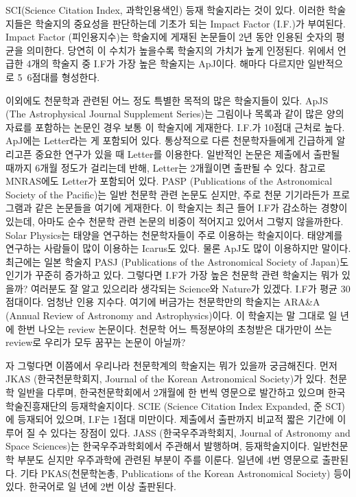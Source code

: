 SCI(Science Citation Index, 과학인용색인) 등재 학술지라는 것이 있다. 이러한
학술지들은 학술지의 중요성을 판단하는데 기초가 되는 Impact Factor (I.F.)가
부여된다. Impact Factor (피인용지수)는 학술지에 게재된 논문들이 2년 동안 인용된
숫자의 평균을 의미한다. 당연히 이 수치가 높을수록 학술지의 가치가 높게
인정된다. 위에서 언급한 4개의 학술지 중 I.F가 가장 높은 학술지는 ApJ이다. 해마다
다르지만 일반적으로 5~6점대를 형성한다.

이외에도 천문학과 관련된 어느 정도 특별한 목적의 많은 학술지들이 있다. ApJS (The
Astrophysical Journal Supplement Series)는 그림이나 목록과 같이 많은 양의 자료를
포함하는 논문인 경우 보통 이 학술지에 게재한다. I.F.가 10점대 근처로 높다.
ApJ에는 Letter라는 게 포함되어 있다. 통상적으로 다른 천문학자들에게 긴급하게
알리고픈 중요한 연구가 있을 때 Letter를 이용한다. 일반적인 논문은 제출에서 출판될
때까지 6개월 정도가 걸리는데 반해, Letter는 2개월이면 출판될 수 있다. 참고로
MNRAS에도 Letter가 포함되어 있다.  PASP (Publications of the Astronomical
Society of the Pacific)는 일반 천문학 관련 논문도 싣지만, 주로 천문 기기라든가
프로그램과 같은 논문들을 여기에 게재한다. 이 학술지는 최근 들어 I.F가 감소하는
경향이 있는데, 아마도 순수 천문학 관련 논문의 비중이 적어지고 있어서 그렇지
않을까한다. Solar Physics는 태양을 연구하는 천문학자들이 주로 이용하는
학술지이다. 태양계를 연구하는 사람들이 많이 이용하는 Icarus도 있다. 물론 ApJ도
많이 이용하지만 말이다. 최근에는 일본 학술지 PASJ (Publications of the
Astronomical Society of Japan)도 인기가 꾸준히 증가하고 있다.  그렇다면 I.F가
가장 높은 천문학 관련 학술지는 뭐가 있을까? 여러분도 잘 알고 있으리라 생각되는
Science와 Nature가 있겠다. I.F가 평균 30점대이다. 엄청난 인용 지수다. 여기에
버금가는 천문학만의 학술지는 ARA\&A (Annual Review of Astronomy and
Astrophysics)이다. 이 학술지는 말 그대로 일 년에 한번 나오는 review
논문이다. 천문학 어느 특정분야의 초청받은 대가만이 쓰는 review로 우리가 모두
꿈꾸는 논문이 아닐까?
 
자 그렇다면 이쯤에서 우리나라 천문학계의 학술지는 뭐가 있을까 궁금해진다. 먼저
JKAS (한국천문학회지, Journal of the Korean Astronomical Society)가 있다. 천문학
일반을 다루며, 한국천문학회에서 2개월에 한 번씩 영문으로 발간하고 있으며
한국학술진흥재단의 등재학술지이다. SCIE (Science Citation Index Expanded, 준
SCI)에 등재되어 있으며, I.F는 1점대 미만이다. 제출에서 출판까지 비교적 짧은
기간에 이루어 질 수 있다는 장점이 있다.  JASS (한국우주과학회지, Journal of
Astronomy and Space Sciences)는 한국우주과학회에서 주관해서 발행하며,
등재학술지이다. 일반천문학 부분도 싣지만 우주과학에 관련된 부분이 주를
이룬다. 일년에 4번 영문으로 출판된다. 기타 PKAS(천문학논총, Publications of the
Korean Astronomical Society) 등이 있다. 한국어로 일 년에 2번 이상 출판된다.

